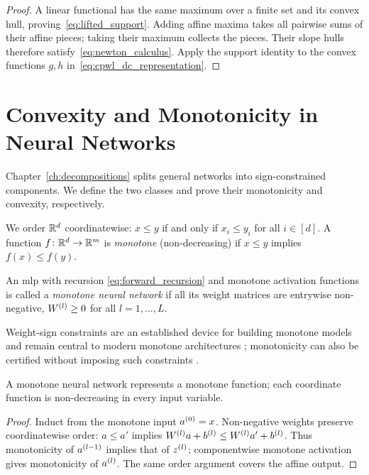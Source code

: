 \begin{proof}
A linear functional has the same maximum over a finite set and its convex hull, proving~\eqref{eq:lifted_support}. Adding affine maxima takes all pairwise sums of their affine pieces; taking their maximum collects the pieces. Their slope hulls therefore satisfy~\eqref{eq:newton_calculus}. Apply the support identity to the convex functions $g,h$ in~\eqref{eq:cpwl_dc_representation}.
\end{proof}

\section{Convexity and Monotonicity in Neural Networks}\label{sec:convex_monotone_foundations}

Chapter~\ref{ch:decompositions} splits general networks into sign-constrained components. We define the two classes and prove their monotonicity and convexity, respectively.

We order $\mathbb{R}^d$ coordinatewise: $x \le y$ if and only if $x_i \le y_i$ for all $i \in [d]$. A function $f \colon \mathbb{R}^d \to \mathbb{R}^m$ is \emph{monotone} (non-decreasing) if $x \le y$ implies $f(x) \le f(y)$.

\begin{definition}\label{def:monotone_network}
An \ac{mlp} with recursion \eqref{eq:forward_recursion} and monotone activation functions is called a \emph{monotone neural network} if all its weight matrices are entrywise non-negative, $W^{(l)} \ge 0$ for all $l = 1, \ldots, L$.
\end{definition}

Weight-sign constraints are an established device for building monotone models \parencite{Sill1997_MonotonicNetworks,Daniels2010_MonotoneNN} and remain central to modern monotone architectures \parencite{Runje_2023}; monotonicity can also be certified without imposing such constraints \parencite{Liu2020CertifiedMonotone}.

\begin{proposition}\label{prop:monotone_represents}
A monotone neural network represents a monotone function; each coordinate function is non-decreasing in every input variable.\end{proposition}

\begin{proof}
Induct from the monotone input $a^{(0)}=x$. Non-negative weights preserve coordinatewise order: $a\le a'$ implies $W^{(l)}a+b^{(l)}\le W^{(l)}a'+b^{(l)}$. Thus monotonicity of $a^{(l-1)}$ implies that of $z^{(l)}$; componentwise monotone activation gives monotonicity of $a^{(l)}$. The same order argument covers the affine output.
\end{proof}

